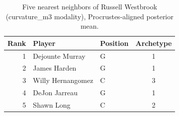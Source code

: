 \begin{table}[htbp]
  \centering\small
  \begin{tabular}{rllc}
    \toprule
    Rank & Player & Position & Archetype \\
    \midrule
    1 & Dejounte Murray & G & 1 \\
    2 & James Harden & G & 1 \\
    3 & Willy Hernangomez & C & 3 \\
    4 & DeJon Jarreau & G & 1 \\
    5 & Shawn Long & C & 2 \\
    \bottomrule
  \end{tabular}
  \caption{Five nearest neighbors of Russell Westbrook (curvature_m3 modality), Procrustes-aligned posterior mean.}
  \label{tab:Russell_Westbrook_neighbors_curvature_m3}
\end{table}

